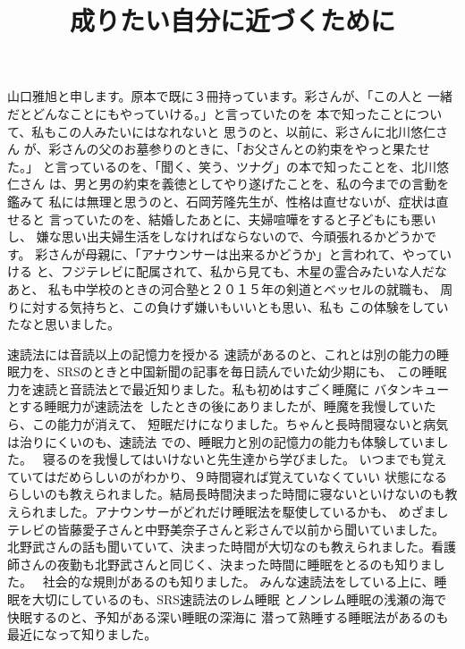 \documentclass{jsarticle}
\begin{document}
\title{成りたい自分に近づくために}
\author{}
\date{}
\maketitle

    山口雅旭と申します。原本で既に３冊持っています。彩さんが、「この人と
一緒だとどんなことにもやっていける。」と言っていたのを
本で知ったことについて、私もこの人みたいにはなれないと
思うのと、以前に、彩さんに北川悠仁さん
が、彩さんの父のお墓参りのときに、「お父さんとの約束をやっと果たせた。」
と言っているのを、「聞く、笑う、ツナグ」の本で知ったことを、北川悠仁さん
は、男と男の約束を義徳としてやり遂げたことを、私の今までの言動を鑑みて
私には無理と思うのと、石岡芳隆先生が、性格は直せないが、症状は直せると
言っていたのを、結婚したあとに、夫婦喧嘩をすると子どもにも悪いし、
嫌な思い出夫婦生活をしなければならないので、今頑張れるかどうかです。
彩さんが母親に、「アナウンサーは出来るかどうか」と言われて、やっていける
と、フジテレビに配属されて、私から見ても、木星の霊合みたいな人だなあと、
私も中学校のときの河合塾と２０１５年の剣道とベッセルの就職も、
周りに対する気持ちと、この負けず嫌いもいいとも思い、私も
この体験をしていたなと思いました。


    速読法には音読以上の記憶力を授かる
速読があるのと、これとは別の能力の睡眠力を、SRSのときと中国新聞の記事を毎日読んでいた幼少期にも、
この睡眠力を速読と音読法とで最近知りました。私も初めはすごく睡魔に
バタンキューとする睡眠力が速読法を
したときの後にありましたが、睡魔を我慢していたら、この能力が消えて、
短眠だけになりました。ちゃんと長時間寝ないと病気は治りにくいのも、速読法
での、睡眠力と別の記憶力の能力も体験していました。　
寝るのを我慢してはいけないと先生達から学びました。
いつまでも覚えていてはだめらしいのがわかり、９時間寝れば覚えていなくていい
状態になるらしいのも教えられました。結局長時間決まった時間に寝ないといけないのも教えられました。アナウンサーがどれだけ睡眠法を駆使しているかも、
めざましテレビの皆藤愛子さんと中野美奈子さんと彩さんで以前から聞いていました。
北野武さんの話も聞いていて、決まった時間が大切なのも教えられました。看護師さんの夜勤も北野武さんと同じく、決まった時間に睡眠をとるのも知りました。　
社会的な規則があるのも知りました。
みんな速読法をしている上に、睡眠を大切にしているのも、SRS速読法のレム睡眠
とノンレム睡眠の浅瀬の海で快眠するのと、予知がある深い睡眠の深海に
潜って熟睡する睡眠法があるのも最近になって知りました。
 
\end{document}

